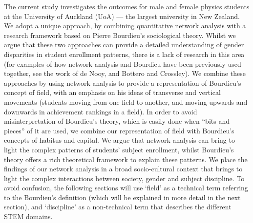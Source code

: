 The current study investigates the outcomes for male and female physics students at the University of Auckland (UoA) --- the largest university in New Zealand. We adopt a unique approach, by combining quantitative network analysis with a research framework based on Pierre Bourdieu's sociological theory.\cite{Bourdieu1984} Whilst we argue that these two approaches can provide a detailed understanding of gender disparities in student enrollment patterns, there is a lack of research in this area (for examples of how network analysis and Bourdieu have been previously used together, see the work of de Nooy\cite{de2003fields}, and Bottero and Crossley\cite{bottero2011worlds}). We combine these approaches by using network analysis to provide a representation of Bourdieu's concept of field, with an emphasis on his ideas of transverse and vertical movements (students moving from one field to another, and moving upwards and downwards in achievement rankings in a field). In order to avoid misinterpretation of Bourdieu's theory, which is easily done when ``bits and pieces'' of it are used\cite{Bourdieu1992}, we combine our representation of field with Bourdieu's concepts of habitus and capital. We argue that network analysis can bring to light the complex patterns of students' subject enrollment, whilst Bourdieu's theory offers a rich theoretical framework to explain these patterns. We place the findings of our network analysis in a broad socio-cultural context that brings to light the complex interactions between society, gender and subject discipline. To avoid confusion, the following sections will use `field' as a technical term referring to the Bourdieu's definition (which will be explained in more detail in the next section), and `discipline' as a non-technical term that describes the different STEM domains. 


